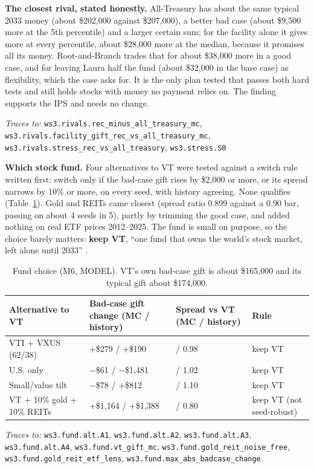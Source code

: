 \documentclass[11pt,a4paper]{article}
\newcommand{\nk}[1]{{\urlstyle{tt}\nolinkurl{#1}}}
\newcommand{\keys}[1]{\par{\footnotesize\raggedright\color{black!60}\textit{Traces to:} #1\par}}
\begin{document}
\textbf{The closest rival, stated honestly.} All-Treasury has about the same typical 2033 money (about \$202,000
against \$207,000), a better bad case (about \$9,500 more at the 5th percentile) and a larger certain sum; for the
facility alone it gives more at every percentile, about \$28,000 more at the median, because it promises all its money.
Root-and-Branch trades that for about \$38,000 more in a good case, and for leaving Laura half the fund (about \$32,000
in the base case) as flexibility, which the case asks for. It is the only plan tested that passes both hard tests and
still holds stocks with money no payment relies on. The finding supports the IPS and needs no change.
\keys{\nk{ws3.rivals.rec_minus_all_treasury_mc}, \nk{ws3.rivals.facility_gift_rec_vs_all_treasury_mc},
\nk{ws3.rivals.stress_rec_vs_all_treasury}, \nk{ws3.stress.S0}}

\textbf{Which stock fund.} Four alternatives to VT were tested against a switch rule written first: switch only if
the bad-case gift rises by \$2,000 or more, or its spread narrows by 10\% or more, on every seed, with history
agreeing. None qualifies (Table~\ref{tab:fund}). Gold and REITs came closest (spread ratio 0.899 against a 0.90 bar,
passing on about 4 seeds in 5), partly by trimming the good case, and added nothing on real ETF prices 2012--2025. The
fund is small on purpose, so the choice barely matters: \textbf{keep VT}, ``one fund that owns the world's stock
market, left alone until 2033'' \citep{sharpe1991arithmetic,doeswijk2014global}.

\begin{table}[h]
\centering\small
\begin{tabularx}{\textwidth}{>{\raggedright}X>{\centering}p{3.4cm}>{\centering}p{3.0cm}>{\raggedright\arraybackslash}p{3.0cm}}
\toprule
Alternative to VT & Bad-case gift change (MC / history) & Spread vs VT (MC / history) & Rule \\
\midrule
VTI + VXUS (62/38) & +\$279 / +\$190 & 0.98 / 0.98 & keep VT \\
U.S. only & $-$\$61 / $-$\$1,481 & 0.98 / 1.02 & keep VT \\
Small/value tilt & $-$\$78 / +\$812 & 1.02 / 1.10 & keep VT \\
VT + 10\% gold + 10\% REITs & +\$1,164 / +\$1,388 & 0.899 / 0.80 & keep VT (not seed-robust) \\
\bottomrule
\end{tabularx}
\caption{Fund choice (M6, MODEL). VT's own bad-case gift is about \$165,000 and its typical gift about \$174,000.}
\label{tab:fund}
\end{table}
\keys{\nk{ws3.fund.alt.A1}, \nk{ws3.fund.alt.A2}, \nk{ws3.fund.alt.A3}, \nk{ws3.fund.alt.A4}, \nk{ws3.fund.vt_gift_mc},
\nk{ws3.fund.gold_reit_noise_free}, \nk{ws3.fund.gold_reit_etf_lens}, \nk{ws3.fund.max_abs_badcase_change}}
\end{document}
